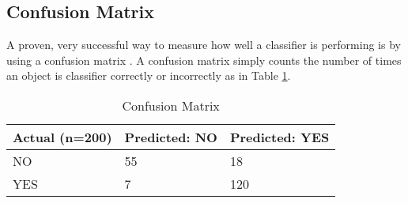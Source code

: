 \subsection*{Confusion Matrix}
A proven, very successful way to measure how well a classifier is performing is by using a confusion matrix \parencite{handsOnML}.
A confusion matrix simply counts the number of times an object is classifier correctly or incorrectly as in Table \ref{cm}.

\begin{table}[]
\centering
\caption{Confusion Matrix}
\label{cm}
\begin{tabular}{|l|l|l|}
\hline
\textbf{Actual (n=200)} & \textbf{Predicted: NO} & \textbf{Predicted: YES} \\ \hline
NO                      & 55                     & 18                      \\ \hline
YES                     & 7                      & 120                     \\ \hline
\end{tabular}
\end{table}

